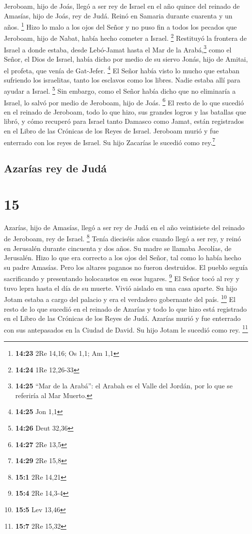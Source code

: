  Jeroboam, hijo de Joás, llegó a ser rey de Israel en el
año quince del reinado de Amasías, hijo de Joás, rey de Judá. Reinó en
Samaria durante cuarenta y un años. \footnote{\textbf{14:23} 2Re 14,16;
  Os 1,1; Am 1,1}  Hizo lo malo a los ojos del Señor y no
puso fin a todos los pecados que Jeroboam, hijo de Nabat, había hecho
cometer a Israel. \footnote{\textbf{14:24} 1Re 12,26-33} 
Restituyó la frontera de Israel a donde estaba, desde Lebó-Jamat hasta
el Mar de la Arabá,\footnote{\textbf{14:25} ``Mar de la Arabá'': el
  Arabah es el Valle del Jordán, por lo que se referiría al Mar Muerto.}
como el Señor, el Dios de Israel, había dicho por medio de su siervo
Jonás, hijo de Amitai, el profeta, que venía de Gat-Jefer. \footnote{\textbf{14:25}
  Jon 1,1}  El Señor había visto lo mucho que estaban
sufriendo los israelitas, tanto los esclavos como los libres. Nadie
estaba allí para ayudar a Israel. \footnote{\textbf{14:26} Deut 32,36}
 Sin embargo, como el Señor había dicho que no eliminaría
a Israel, lo salvó por medio de Jeroboam, hijo de Joás. \footnote{\textbf{14:27}
  2Re 13,5}  El resto de lo que sucedió en el reinado de
Jeroboam, todo lo que hizo, sus grandes logros y las batallas que libró,
y cómo recuperó para Israel tanto Damasco como Jamat, están registrados
en el Libro de las Crónicas de los Reyes de Israel. 
Jeroboam murió y fue enterrado con los reyes de Israel. Su hijo Zacarías
le sucedió como rey.\footnote{\textbf{14:29} 2Re 15,8}

\hypertarget{azaruxedas-rey-de-juduxe1}{%
\subsection{Azarías rey de Judá}\label{azaruxedas-rey-de-juduxe1}}

\hypertarget{section-14}{%
\section{15}\label{section-14}}

 Azarías, hijo de Amasías, llegó a ser rey de Judá en el
año veintisiete del reinado de Jeroboam, rey de Israel. \footnote{\textbf{15:1}
  2Re 14,21}  Tenía dieciséis años cuando llegó a ser rey,
y reinó en Jerusalén durante cincuenta y dos años. Su madre se llamaba
Jecolías, de Jerusalén.  Hizo lo que era correcto a los
ojos del Señor, tal como lo había hecho su padre Amasías. 
Pero los altares paganos no fueron destruidos. El pueblo seguía
sacrificando y presentando holocaustos en esos lugares. \footnote{\textbf{15:4}
  2Re 14,3-4}  El Señor tocó al rey y tuvo lepra hasta el
día de su muerte. Vivió aislado en una casa aparte. Su hijo Jotam estaba
a cargo del palacio y era el verdadero gobernante del país. \footnote{\textbf{15:5}
  Lev 13,46}  El resto de lo que sucedió en el reinado de
Azarías y todo lo que hizo está registrado en el Libro de las Crónicas
de los Reyes de Judá.  Azarías murió y fue enterrado con
sus antepasados en la Ciudad de David. Su hijo Jotam le sucedió como
rey. \footnote{\textbf{15:7} 2Re 15,32}

